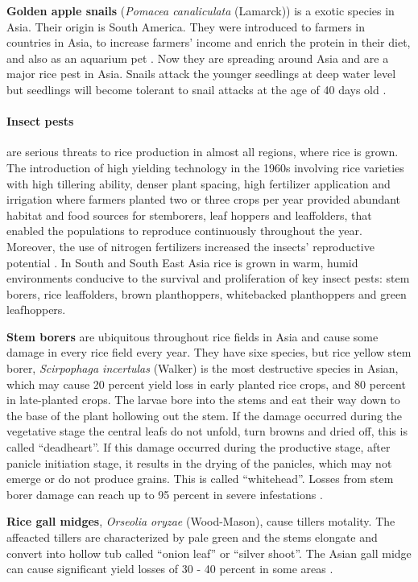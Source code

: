 \documentclass[12pt, oneside]{report}
\begin{document}
\textbf{Golden apple snails} (\textit{Pomacea canaliculata} (Lamarck)) is a exotic species in Asia. Their origin is South America. They were introduced to farmers in countries in Asia, to increase farmers' income and enrich the protein in their diet, and also as an aquarium pet \citep{joshi2007problems}. Now they are spreading around Asia and are a major rice pest in Asia. Snails attack the younger seedlings at deep water level but seedlings will become tolerant to snail attacks at the age of 40 days old \citep{sin2003damage}.

\paragraph{Insect pests} are serious threats to rice production in almost all regions, where rice is grown. The introduction of high yielding technology in the 1960s involving rice varieties with high tillering ability, denser plant spacing, high fertilizer application and irrigation where farmers planted two or three crops per year provided abundant habitat and food sources for stemborers, leaf hoppers and leaffolders, that enabled the populations to reproduce continuously throughout the year. Moreover, the use of nitrogen fertilizers increased the insects' reproductive potential \citep{bottrell2012resurrecting}. In South and South East Asia rice is grown in warm, humid environments conducive to the survival and proliferation of key insect pests: stem borers, rice leaffolders, brown planthoppers, whitebacked planthoppers and green leafhoppers.

\textbf{Stem borers} are ubiquitous throughout rice fields in Asia and cause some damage in every rice field every year. They have sixe species, but rice yellow stem borer, \textit{Scirpophaga incertulas} (Walker) is the most destructive species in Asian, which may cause 20 percent yield loss in early planted rice crops, and 80 percent in late-planted crops. The larvae bore into the stems and eat their way down to the base of the plant hollowing out the stem. If the damage occurred during the vegetative stage the central leafs do not unfold, turn browns and dried off, this is called ``deadheart''. If this damage occurred during the productive stage, after panicle initiation stage, it results in the drying of the panicles, which may not emerge or do not produce grains. This is called ``whitehead''. Losses from stem borer damage can reach up to 95 percent in severe infestations \citep{irrirkb}. 

\textbf{Rice gall midges}, \textit{Orseolia oryzae} (Wood-Mason), cause tillers motality. The affeacted tillers are characterized by pale green and the stems elongate and convert into hollow tub called ``onion leaf'' or ``silver shoot''. The Asian gall midge can cause significant yield losses of 30 - 40 percent in some areas \citep{irrirkb}.
\end{document}

